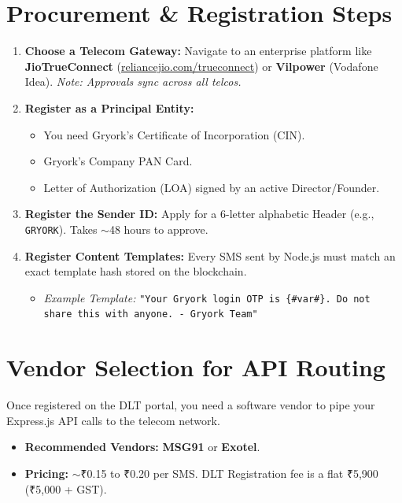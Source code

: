 \documentclass[11pt, a4paper]{report}
\begin{document}
\section{Procurement \& Registration Steps}
\begin{enumerate}[label=\textbf{\textcolor{gryorkBlue}{\arabic*.}}, itemsep=0.3em]
    \item \textbf{Choose a Telecom Gateway:} Navigate to an enterprise platform like \textbf{JioTrueConnect} (\url{reliancejio.com/trueconnect}) or \textbf{Vilpower} (Vodafone Idea). \textit{Note: Approvals sync across all telcos.}
    \item \textbf{Register as a Principal Entity:} 
        \begin{itemize}
            \item You need Gryork’s Certificate of Incorporation (CIN).
            \item Gryork's Company PAN Card.
            \item Letter of Authorization (LOA) signed by an active Director/Founder.
        \end{itemize}
    \item \textbf{Register the Sender ID:} Apply for a 6-letter alphabetic Header (e.g., \texttt{GRYORK}). Takes $\sim$48 hours to approve.
    \item \textbf{Register Content Templates:} Every SMS sent by Node.js must match an exact template hash stored on the blockchain. 
        \begin{itemize}
            \item \textit{Example Template:} \texttt{"Your Gryork login OTP is \{\#var\#\}. Do not share this with anyone. - Gryork Team"}
        \end{itemize}
\end{enumerate}

\section{Vendor Selection for API Routing}
Once registered on the DLT portal, you need a software vendor to pipe your Express.js API calls to the telecom network.
\begin{itemize}
    \item \textbf{Recommended Vendors:} \textbf{MSG91} or \textbf{Exotel}.
    \item \textbf{Pricing:} $\sim$₹0.15 to ₹0.20 per SMS. DLT Registration fee is a flat ₹5,900 (₹5,000 + GST).
\end{itemize}
\end{document}
